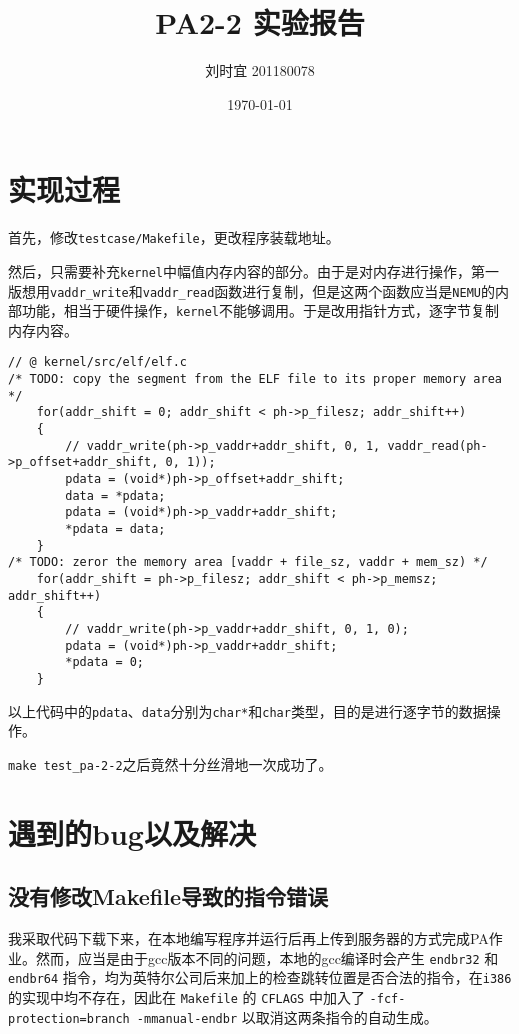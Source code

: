 \documentclass[UTF8]{ctexart}
\title{\textbf{PA2-2 实验报告}}
\author{刘时宜 201180078}
\date{\today}
\begin{document}
\maketitle
\tableofcontents

\section{实现过程}
首先，修改\verb|testcase/Makefile|，更改程序装载地址。

然后，只需要补充\verb|kernel|中幅值内存内容的部分。由于是对内存进行操作，第一版想用\verb|vaddr_write|和\verb|vaddr_read|函数进行复制，但是这两个函数应当是\verb|NEMU|的内部功能，相当于硬件操作，\verb|kernel|不能够调用。于是改用指针方式，逐字节复制内存内容。

\lstset{language=C}
\begin{lstlisting}[style=CStyle]
// @ kernel/src/elf/elf.c
/* TODO: copy the segment from the ELF file to its proper memory area */
    for(addr_shift = 0; addr_shift < ph->p_filesz; addr_shift++)
    {
        // vaddr_write(ph->p_vaddr+addr_shift, 0, 1, vaddr_read(ph->p_offset+addr_shift, 0, 1));
        pdata = (void*)ph->p_offset+addr_shift;
        data = *pdata;
        pdata = (void*)ph->p_vaddr+addr_shift;
        *pdata = data;
    }
/* TODO: zeror the memory area [vaddr + file_sz, vaddr + mem_sz) */
    for(addr_shift = ph->p_filesz; addr_shift < ph->p_memsz; addr_shift++)
    {
        // vaddr_write(ph->p_vaddr+addr_shift, 0, 1, 0);
        pdata = (void*)ph->p_vaddr+addr_shift;
        *pdata = 0;
    }
\end{lstlisting}

以上代码中的\verb|pdata|、\verb|data|分别为\verb|char*|和\verb|char|类型，目的是进行逐字节的数据操作。

\verb|make test_pa-2-2|之后竟然十分丝滑地一次成功了。

\section{遇到的bug以及解决}
\subsection{没有修改Makefile导致的指令错误}
我采取代码下载下来，在本地编写程序并运行后再上传到服务器的方式完成PA作业。然而，应当是由于gcc版本不同的问题，本地的gcc编译时会产生 \verb|endbr32| 和 \verb|endbr64| 指令，均为英特尔公司后来加上的检查跳转位置是否合法的指令，在\verb|i386|的实现中均不存在，因此在 \verb|Makefile| 的 \verb|CFLAGS| 中加入了 \verb|-fcf-protection=branch -mmanual-endbr| 以取消这两条指令的自动生成。
\end{document}
